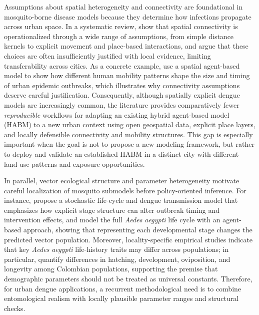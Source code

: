\documentclass[applsci,article,accept,pdftex,moreauthors]{Definitions/mdpi}
\begin{document}
Assumptions about spatial heterogeneity and connectivity are foundational in mosquito-borne disease models because they determine how infections propagate across urban space. In a systematic review, \cite{Lee2021SpatialConnectivityReview} show that spatial connectivity is operationalized through a wide range of assumptions, from simple distance kernels to explicit movement and place-based interactions, and argue that these choices are often insufficiently justified with local evidence, limiting transferability across cities. As a concrete example, \cite{Topirceanu2024SpatialMobilityABM} use a spatial agent-based model to show how different human mobility patterns shape the size and timing of urban epidemic outbreaks, which illustrates why connectivity assumptions deserve careful justification. Consequently, although spatially explicit dengue models are increasingly common, the literature provides comparatively fewer \emph{reproducible} workflows for adapting an existing hybrid agent-based model (HABM) to a new urban context using open geospatial data, explicit place layers, and locally defensible connectivity and mobility structures. This gap is especially important when the goal is not to propose a new modeling framework, but rather to deploy and validate an established HABM in a distinct city with different land-use patterns and exposure opportunities.

In parallel, vector ecological structure and parameter heterogeneity motivate careful localization of mosquito submodels before policy-oriented inference. For instance, \cite{Cruz2023StochasticAedesLifeCycle} propose a stochastic life-cycle and dengue transmission model that emphasizes how explicit stage structure can alter outbreak timing and intervention effects, and \cite{Pascoe2025AedesLifeCycleABM} model the full \textit{Aedes aegypti} life cycle with an agent-based approach, showing that representing each developmental stage changes the predicted vector population. Moreover, locality-specific empirical studies indicate that key \textit{Aedes aegypti} life-history traits may differ across populations; in particular, \cite{ArevaloCortes2022InsectsColombiaAedes} quantify differences in hatching, development, oviposition, and longevity among Colombian populations, supporting the premise that demographic parameters should not be treated as universal constants. Therefore, for urban dengue applications, a recurrent methodological need is to combine entomological realism with locally plausible parameter ranges and structural checks.
\end{document}
